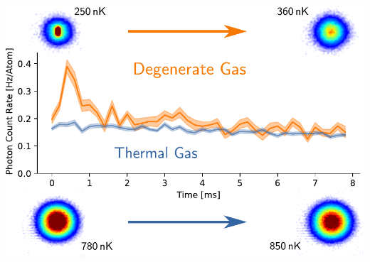 \documentclass[a4paper]{article}
\begin{document}
\vfill

\begin{center}
\includegraphics[width=\linewidth]{Figure.pdf}
\end{center}

\vfill

\printbibliography[heading=none]
\end{document}
